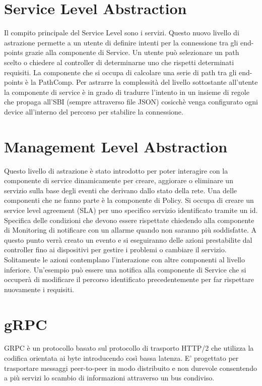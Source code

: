 \section{Service Level Abstraction}
Il compito principale del Service Level sono i servizi. 
Questo nuovo livello di astrazione permette a un utente di definire intenti per la connessione tra gli end-points grazie alla componente di Service.
Un utente può selezionare un path scelto o chiedere al controller di determinarne uno che rispetti determinati requisiti. La componente che si occupa di calcolare una serie di 
path tra gli end-points è la PathComp. 
Per astrarre la complessità del livello sottostante all'utente la componente di service è in grado di tradurre l'intento in un insieme di regole che propaga all'SBI (sempre attraverso file JSON)
cosicchè venga configurato ogni device all'interno del percorso per stabilire la connessione.

\section{Management Level Abstraction}
Questo livello di astrazione è stato introdotto per poter interagire con la componente di service dinamicamente per creare, aggiorare o eliminare un servizio sulla base degli eventi che derivano dallo stato della rete.
Una delle componenti che ne fanno parte è la componente di Policy. Si occupa di creare un service level agreement (SLA) per uno specifico servizio identificato tramite un id.
Specifica delle condizioni che devono essere rispettate chiedendo alla componente di Monitoring di notificare con un allarme quando non saranno più soddisfatte.
A questo punto verrà creato un evento e si eseguiranno delle azioni prestabilite dal controller fino ai dispositivi per gestire i problemi o cambiare il servizio. 
Solitamente le azioni contemplano l'interazione con altre componenti al livello inferiore.
Un'esempio può essere una notifica alla componente di Service che si occuperà di modificare il percorso identificato precedentemente per far rispettare nuovamente i requisiti.


\section{gRPC}
GRPC è un protocollo basato sul protocollo di trasporto HTTP/2 che utilizza la codifica orientata ai byte introducendo così bassa latenza.
E' progettato per trasportare messaggi peer-to-peer in modo distribuito e non durevole consentendo a più servizi lo scambio di informazioni attraverso un bus condiviso.